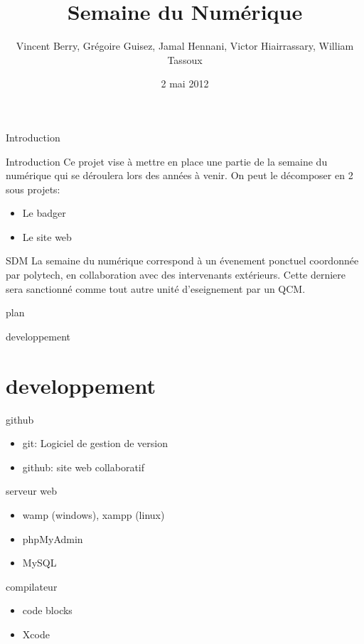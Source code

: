 \documentclass{beamer}
\title{Semaine du Numérique}
\author{Vincent Berry, Grégoire Guisez, Jamal Hennani, Victor Hiairrassary, William Tassoux}
\institute{Polytech' Montpellier, Lirmm}
\date{2 mai 2012}
\begin{document}
\small 


\begin{frame}
    \titlepage
\end{frame}



\begin{frame}{Introduction}
        \begin{block}{Introduction}
 		 Ce projet vise à mettre en place une partie de la semaine du numérique qui se déroulera lors des années à venir.
		 On peut le décomposer en 2 sous projets:
		\begin{itemize}
			\item Le badger
			\item Le site web
		\end{itemize}
	\end{block}

    	\begin{block}{SDM}
 		 La semaine du numérique correspond à un évenement ponctuel coordonnée par polytech, en collaboration avec des intervenants extérieurs. 			 Cette derniere sera sanctionné comme tout autre unité d'eseignement par un QCM.
	\end{block}	
\end{frame}


\begin{frame}{plan}

 	\tableofcontents
\end{frame}

\begin{frame}{developpement}
 \section{developpement}

	\begin{block}{github}
		\begin{itemize}
			\item git: Logiciel de gestion de version
			\item github: site web collaboratif
		\end{itemize}
	\end{block}

	\begin{block}{serveur web}
		\begin{itemize}
			\item wamp (windows), xampp (linux)
			\item phpMyAdmin
			\item MySQL
		\end{itemize}
	\end{block}

	\begin{block}{compilateur}
		\begin{itemize}
			\item code blocks
			\item Xcode
		\end{itemize}
	\end{block}

\end{frame}
\end{document}
